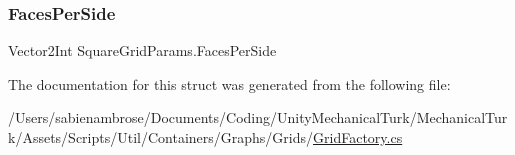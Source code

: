 \mbox{\label{struct_square_grid_params_af19744bb944c6a51cacd30c9d3ac9059}} 
\subsubsection{\texorpdfstring{Faces\+Per\+Side}{FacesPerSide}}
{\footnotesize\ttfamily Vector2\+Int Square\+Grid\+Params.\+Faces\+Per\+Side}



The documentation for this struct was generated from the following file\+:\begin{DoxyCompactItemize}
\item 
/\+Users/sabienambrose/\+Documents/\+Coding/\+Unity\+Mechanical\+Turk/\+Mechanical\+Turk/\+Assets/\+Scripts/\+Util/\+Containers/\+Graphs/\+Grids/\mbox{\hyperlink{_grid_factory_8cs}{Grid\+Factory.\+cs}}\end{DoxyCompactItemize}

